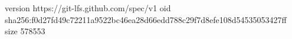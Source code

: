 version https://git-lfs.github.com/spec/v1
oid sha256:f0d27fd49c72211a9522bc46ea28d66edd788c29f7d8efe108d54535053427ff
size 578553
